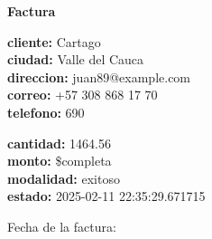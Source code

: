 \documentclass{article}
\begin{document}
\begin{center}
    {\LARGE \textbf{Factura}}\\[1cm]
\end{center}

\textbf{cliente:} Cartago \\
\textbf{ciudad:} Valle del Cauca \\
\textbf{direccion:} juan89@example.com \\
\textbf{correo:} +57 308 868 17 70 \\
\textbf{telefono:} 690 \\

\vspace{0.5cm}

\textbf{cantidad:} 1464.56 \\
\textbf{monto:} \$completa \\
\textbf{modalidad:} exitoso \\
\textbf{estado:} 2025-02-11 22:35:29.671715 \\

\vspace{1cm}

Fecha de la factura: 
\end{document}
